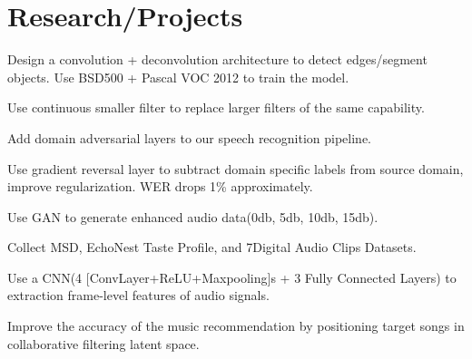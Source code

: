 \documentclass[]{deedy-resume-openfont}
\begin{document}
\begin{minipage}[t]{0.69\textwidth}
\sectionsep

\section{Research/Projects}



\begin{tightemize}
\item Design a convolution + deconvolution architecture to detect edges/segment objects. Use BSD500 + Pascal VOC 2012 to train the model.
\item Use continuous smaller filter to replace larger filters of the same capability.
\end{tightemize}

\sectionsep %

\begin{tightemize}
\item Add domain adversarial layers to our speech recognition pipeline.
\item Use gradient reversal layer to subtract domain specific labels from source domain, improve regularization. WER drops 1\% approximately.
\item Use GAN to generate enhanced audio data(0db, 5db, 10db, 15db).
\end{tightemize}

\sectionsep %

\begin{tightemize}
\item Collect MSD, EchoNest Taste Profile, and 7Digital Audio Clips Datasets.
\item Use a CNN(4 [ConvLayer+ReLU+Maxpooling]s + 3 Fully Connected Layers) to extraction frame-level features of audio signals.
\item Improve the accuracy of the music recommendation by positioning target songs in collaborative filtering latent space.
\end{tightemize}


\end{minipage}
\end{document}
